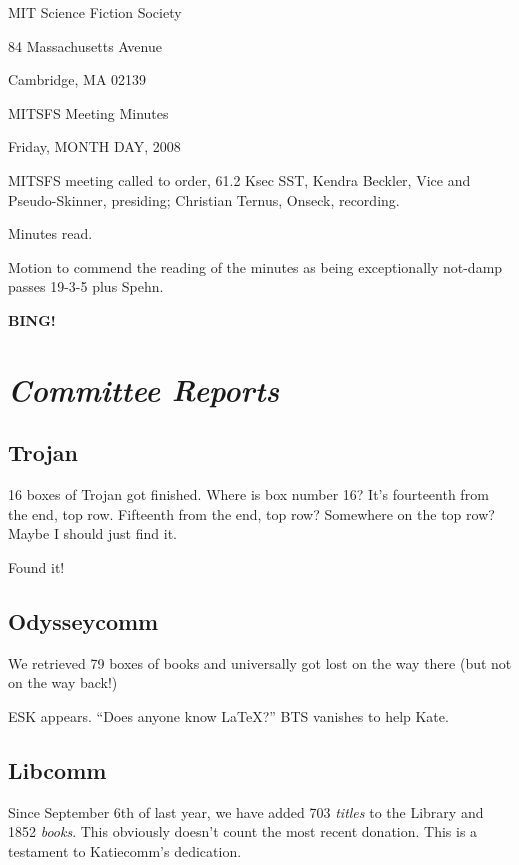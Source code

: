 \documentclass[10pt]{article}
\newcommand{\bing}{{\bf BING!} }
\newcommand{\goto}[1]{\bing \vskip 12pt \section*{{\em{#1}}}}
\newcommand{\ps}{ plus Spehn\xspace}
\begin{document}
\begin{center}

MIT Science Fiction Society

84 Massachusetts Avenue

Cambridge, MA 02139

\vspace{12pt}

MITSFS Meeting Minutes

Friday, MONTH DAY, 2008

\end{center}

\vspace{18pt}

\setlength{\parskip}{6pt}

\noindent
MITSFS meeting called to order, 61.2 Ksec SST,
Kendra Beckler, Vice and Pseudo-Skinner, presiding; Christian Ternus, Onseck, recording.

Minutes read.

Motion to commend the reading of the minutes as being exceptionally not-damp passes 19-3-5 \ps.

\goto{Committee Reports}

\subsection*{Trojan}

16 boxes of Trojan got finished.  Where is box number 16?  It's
fourteenth from the end, top row.  Fifteenth from the end, top row?
Somewhere on the top row?  Maybe I should just find it.

Found it!

\subsection*{Odysseycomm}

We retrieved 79 boxes of books and universally got lost on the way
there (but not on the way back!)

ESK appears.  ``Does anyone know \LaTeX{}?''  BTS vanishes to help Kate.

\subsection*{Libcomm}

Since September 6th of last year, we have added 703 \emph{titles} to
the Library and 1852 \emph{books}.  This obviously doesn't count the
most recent donation.  This is a testament to Katiecomm's dedication.
\end{document}
